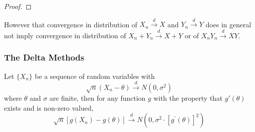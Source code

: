 \begin{proof}

\end{proof}

\begin{remark}
	However that convergence in distribution of $X_{n}\stackrel{d}{\rightarrow}X$ and $Y_{n}\stackrel{d}{\rightarrow}Y$ does in general not imply convergence in distribution of $X_n+Y_n\stackrel{d}{\rightarrow}X+Y$ or of $X_nY_n\stackrel{d}{\rightarrow}XY$.
\end{remark}

\subsubsection{The Delta Methods}

\begin{theorem}
	Let $\{X_{n}\}$ be a sequence of random variables with
	\begin{equation}
		\sqrt{n}\left(X_{n}-\theta\right)\stackrel{d}{\rightarrow}N\left(0,\sigma^{2}\right)
	\end{equation}
	where $\theta$ and $\sigma$ are finite, then for any function $g$ with the property that $g'(\theta)$ exists and is non-zero valued,
	\begin{equation}
		\sqrt{n}\left[g\left(X_{n}\right)-g(\theta)\right] \stackrel{d}{\rightarrow}N\left(0,\sigma^{2}\cdot\left[g^{\prime}(\theta)\right]^{2}\right)
	\end{equation}
\end{theorem}

